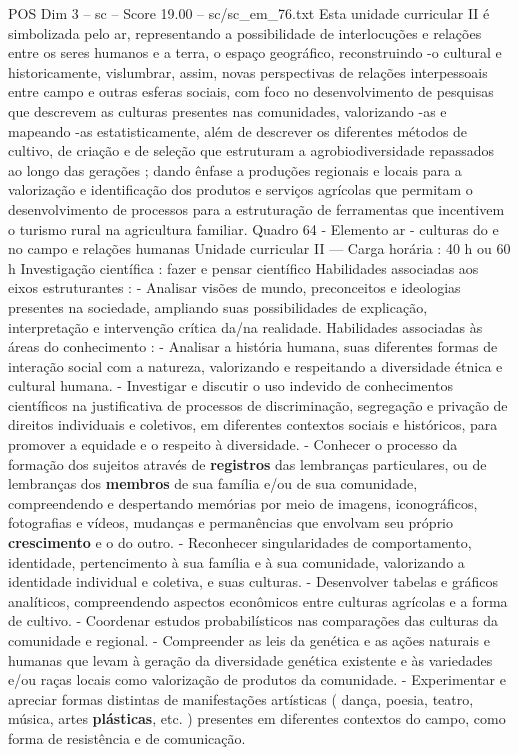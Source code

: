 \begin{textsample}{POS Dim 3 – sc – Score 19.00 – sc/sc\_em\_76.txt}
Esta unidade curricular II é simbolizada pelo ar, representando a possibilidade de interlocuções e relações entre os seres humanos e a terra, o espaço geográfico, reconstruindo -o cultural e historicamente, vislumbrar, assim, novas perspectivas de relações interpessoais entre campo e outras esferas sociais, com foco no desenvolvimento de pesquisas que descrevem as culturas presentes nas comunidades, valorizando -as e mapeando -as estatisticamente, além de descrever os diferentes métodos de cultivo, de criação e de seleção que estruturam a agrobiodiversidade repassados ao longo das gerações ; dando ênfase a produções regionais e locais para a valorização e identificação dos produtos e serviços agrícolas que permitam o desenvolvimento de processos para a estruturação de ferramentas que incentivem o turismo rural na agricultura familiar.
Quadro 64 - Elemento ar - culturas do e no campo e relações humanas Unidade curricular II — Carga horária : 40 h ou 60 h Investigação científica : fazer e pensar científico Habilidades associadas aos eixos estruturantes : - Analisar visões de mundo, preconceitos e ideologias presentes na sociedade, ampliando suas possibilidades de explicação, interpretação e intervenção crítica da/na realidade.
Habilidades associadas às áreas do conhecimento : - Analisar a história humana, suas diferentes formas de interação social com a natureza, valorizando e respeitando a diversidade étnica e cultural humana. - Investigar e discutir o uso indevido de conhecimentos científicos na justificativa de processos de discriminação, segregação e privação de direitos individuais e coletivos, em diferentes contextos sociais e históricos, para promover a equidade e o respeito à diversidade. - Conhecer o processo da formação dos sujeitos através de \textbf{registros} das lembranças particulares, ou de lembranças dos \textbf{membros} de sua família e/ou de sua comunidade, compreendendo e despertando memórias por meio de imagens, iconográficos, fotografias e vídeos, mudanças e permanências que envolvam seu próprio \textbf{crescimento} e o do outro. - Reconhecer singularidades de comportamento, identidade, pertencimento à sua família e à sua comunidade, valorizando a identidade individual e coletiva, e suas culturas. - Desenvolver tabelas e gráficos analíticos, compreendendo aspectos econômicos entre culturas agrícolas e a forma de cultivo. - Coordenar estudos probabilísticos nas comparações das culturas da comunidade e regional. - Compreender as leis da genética e as ações naturais e humanas que levam à geração da diversidade genética existente e às variedades e/ou raças locais como valorização de produtos da comunidade. - Experimentar e apreciar formas distintas de manifestações artísticas ( dança, poesia, teatro, música, artes \textbf{plásticas}, etc. ) presentes em diferentes contextos do campo, como forma de resistência e de comunicação.

\end{textsample}
